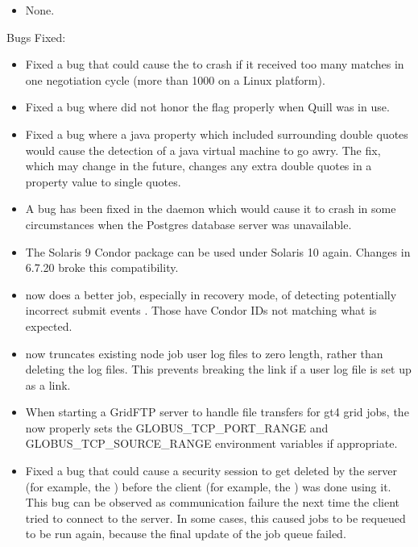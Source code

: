 \begin{itemize}

\item None.

\end{itemize}

\noindent Bugs Fixed:

\begin{itemize}

\item Fixed a bug that could cause the  to crash if it
received too many matches in one negotiation cycle (more than 1000 on a
Linux platform).

\item Fixed a bug where  did not honor the  flag
properly when Quill was in use.

\item Fixed a bug where a java property which included surrounding double quotes
would cause the detection of a java virtual machine to go awry. 
The fix, which may change in the future, changes any extra double quotes
in a property value to single quotes.

\item A bug has been fixed in the  daemon which would
cause it to crash in some circumstances when the Postgres database
server was unavailable.

\item The Solaris 9 Condor package can be used under Solaris 10 again.
Changes in 6.7.20 broke this compatibility.

\item {} now does a better job, especially in recovery mode,
of detecting potentially incorrect submit events .
Those have Condor IDs not matching what is expected.

\item {} now truncates existing node job user log files
to zero length, rather than deleting the log files.  This prevents breaking the
link if a user log file is set up as a link.

\item When starting a GridFTP server to handle file transfers for gt4
grid jobs, the  now properly sets the
GLOBUS\_TCP\_PORT\_RANGE and GLOBUS\_TCP\_SOURCE\_RANGE environment
variables if appropriate.

\item Fixed a bug that could cause a security session to get deleted
by the server (for example, the ) before the client
(for example, the ) was done using it.
This bug can be observed as
communication failure the next time the client tried to connect to
the server.  In some cases, this caused jobs to be requeued to be run
again, because the final update of the job queue failed.


\end{itemize}
